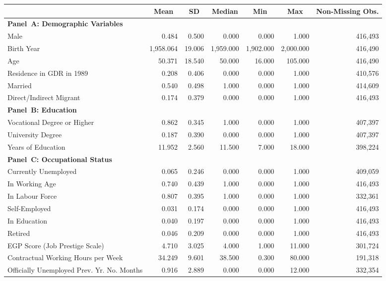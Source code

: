 \begin{tabular}{l*{1}{rrrrrr}}
\toprule
& \multicolumn{1}{c}{Mean} & \multicolumn{1}{c}{SD} & \multicolumn{1}{c}{Median} & \multicolumn{1}{c}{Min} & \multicolumn{1}{c}{Max} & \multicolumn{1}{c}{Non-Missing Obs.}\\
\midrule
\multicolumn{7}{l}{\textbf{Panel~A: Demographic Variables}}\\
Male 
& 0.484 & 0.500 & 0.000 & 0.000 & 1.000 & 416,493\\
Birth Year 
& 1,958.064 & 19.006 & 1,959.000 & 1,902.000 & 2,000.000 & 416,490\\
Age 
& 50.371 & 18.540 & 50.000 & 16.000 & 105.000 & 416,490\\
Residence in GDR in 1989 
& 0.208 & 0.406 & 0.000 & 0.000 & 1.000 & 410,576\\
Married 
& 0.540 & 0.498 & 1.000 & 0.000 & 1.000 & 414,609\\
Direct/Indirect Migrant 
& 0.174 & 0.379 & 0.000 & 0.000 & 1.000 & 416,493\\
\midrule
\multicolumn{7}{l}{\textbf{Panel~B: Education}}\\
Vocational Degree or Higher 
& 0.862 & 0.345 & 1.000 & 0.000 & 1.000 & 407,397\\
University Degree 
& 0.187 & 0.390 & 0.000 & 0.000 & 1.000 & 407,397\\
Years of Education 
& 11.952 & 2.560 & 11.500 & 7.000 & 18.000 & 398,224\\
\midrule
\multicolumn{7}{l}{\textbf{Panel~C: Occupational Status}}\\
Currently Unemployed 
& 0.065 & 0.246 & 0.000 & 0.000 & 1.000 & 409,059\\
In Working Age 
& 0.740 & 0.439 & 1.000 & 0.000 & 1.000 & 416,493\\
In Labour Force 
& 0.807 & 0.395 & 1.000 & 0.000 & 1.000 & 332,361\\
Self-Employed 
& 0.031 & 0.174 & 0.000 & 0.000 & 1.000 & 416,493\\
In Education 
& 0.040 & 0.197 & 0.000 & 0.000 & 1.000 & 416,493\\
Retired 
& 0.046 & 0.209 & 0.000 & 0.000 & 1.000 & 416,493\\
EGP Score (Job Prestige Scale) 
& 4.710 & 3.025 & 4.000 & 1.000 & 11.000 & 301,724\\
Contractual Working Hours per Week 
& 34.249 & 9.601 & 38.500 & 0.300 & 80.000 & 191,318\\
Officially Unemployed Prev. Yr. No. Months 
& 0.916 & 2.889 & 0.000 & 0.000 & 12.000 & 332,354\\

\end{tabular}
